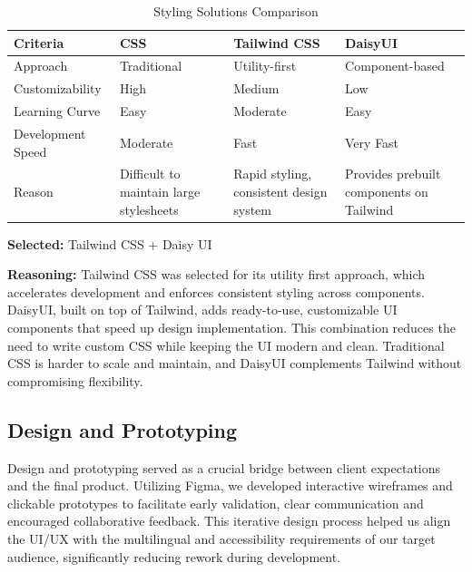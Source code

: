 \begin{table}[H]
\centering
\caption{Styling Solutions Comparison}
\begin{tabular}{|l|p{4cm}|p{4cm}|p{4cm}|}
\hline
\textbf{Criteria}       & \textbf{CSS}               & \textbf{Tailwind CSS}        & \textbf{DaisyUI}             \\
\hline
Approach                & Traditional                & Utility-first                & Component-based              \\
Customizability         & High                       & Medium                      & Low                         \\
Learning Curve          & Easy                       & Moderate                    & Easy                        \\
Development Speed       & Moderate                   & Fast                        & Very Fast                   \\
Reason                  & Difficult to maintain large stylesheets & Rapid styling, consistent design system & Provides prebuilt components on Tailwind \\
\hline
\end{tabular}
\label{tab:styling-solutions-comparison}
\end{table}

\textbf{Selected:} Tailwind CSS + Daisy UI \par
\textbf{Reasoning:} Tailwind CSS was selected for its utility first approach, which accelerates development and enforces consistent styling across components. DaisyUI, built on top of Tailwind, adds ready-to-use, customizable UI components that speed up design implementation. This combination reduces the need to write custom CSS while keeping the UI modern and clean. Traditional CSS is harder to scale and maintain, and DaisyUI complements Tailwind without compromising flexibility.

\vspace{2em}

\subsection{Design and Prototyping}

Design and prototyping served as a crucial bridge between client expectations and the final product. Utilizing Figma, we developed interactive wireframes and clickable prototypes to facilitate early validation, clear communication and encouraged collaborative feedback. This iterative design process helped us align the UI/UX with the multilingual and accessibility requirements of our target audience, significantly reducing rework during development.

